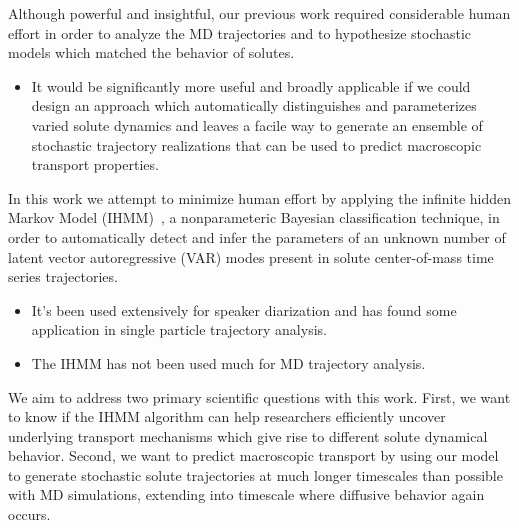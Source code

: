 \documentclass[journal=jpcbfk,manuscript=article]{achemso}
\begin{document}
  Although powerful and insightful, our previous work required considerable human effort
  in order to analyze the MD trajectories and to hypothesize stochastic models which
  matched the behavior of solutes.
  \begin{itemize}
    \item It would be significantly more useful and broadly applicable if we could 
    design an approach which automatically distinguishes and parameterizes varied solute 
    dynamics and leaves a facile way to generate an ensemble of stochastic trajectory
    realizations that can be used to predict macroscopic transport properties.
  \end{itemize}
  
  In this work we attempt to minimize human effort by applying the infinite hidden 
  Markov Model (IHMM)~\cite{beal_infinite_2002,calderon_inferring_2015}, a nonparameteric 
  Bayesian classification technique, in order to automatically detect and infer the 
  parameters of an unknown number of latent vector autoregressive (VAR) modes present 
  in solute center-of-mass time series trajectories. 
  \begin{itemize}
    \item It's been used extensively for speaker diarization and has found some application
    in single particle trajectory analysis.
    \item The IHMM has not been used much for MD trajectory analysis.

  \end{itemize}
  
  We aim to address two primary scientific 
  questions with this work. 
  First, we want
  to know if the IHMM algorithm can help researchers efficiently uncover underlying
  transport mechanisms which give rise to different solute dynamical behavior.
  Second, we want to predict macroscopic transport by using our model to generate 
  stochastic solute trajectories at much longer timescales than possible with MD simulations, 
  extending into timescale where diffusive behavior again occurs.
  
\end{document}
